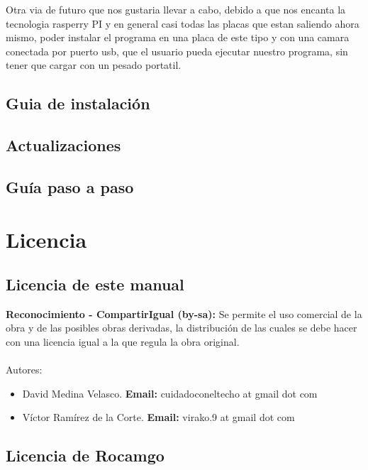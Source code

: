 \documentclass[12pt,a4paper]{report}
\begin{document}
Otra via de futuro que nos gustaria llevar a cabo, debido a que nos encanta la tecnologia rasperry PI y en general casi todas las placas que estan saliendo ahora mismo, poder instalar el programa en una placa de este tipo y con una camara conectada por puerto usb, que el usuario pueda ejecutar nuestro programa, sin tener que cargar con un pesado portatil. 

\section{Guia de instalación}
\section{Actualizaciones}
\section{Guía paso a paso}




\chapter{Licencia}

\section{Licencia de este manual}

\textbf{Reconocimiento - CompartirIgual (by-sa):} Se permite el uso comercial de la obra y de las posibles obras derivadas, la distribución de las cuales se debe hacer con una licencia igual a la que regula la obra original. \\ \\


Autores: 
\begin{itemize}
\item David Medina Velasco. \textbf{Email:} cuidadoconeltecho at gmail dot com 
\item Víctor Ramírez de la Corte. \textbf{Email:} virako.9 at gmail dot com
\end{itemize}

\section{Licencia de Rocamgo}
\end{document}

